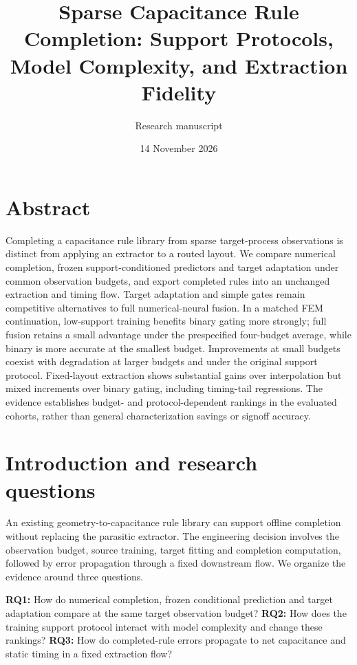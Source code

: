 \documentclass[10pt,twocolumn]{article}
\title{Sparse Capacitance Rule Completion: Support Protocols, Model Complexity, and Extraction Fidelity}
\author{Research manuscript}
\date{14 November 2026}
\begin{document}
\maketitle

\section*{Abstract}

Completing a capacitance rule library from sparse target-process observations is distinct from applying an extractor to a routed layout. We compare numerical completion, frozen support-conditioned predictors and target adaptation under common observation budgets, and export completed rules into an unchanged extraction and timing flow. Target adaptation and simple gates remain competitive alternatives to full numerical-neural fusion. In a matched FEM continuation, low-support training benefits binary gating more strongly; full fusion retains a small advantage under the prespecified four-budget average, while binary is more accurate at the smallest budget. Improvements at small budgets coexist with degradation at larger budgets and under the original support protocol. Fixed-layout extraction shows substantial gains over interpolation but mixed increments over binary gating, including timing-tail regressions. The evidence establishes budget- and protocol-dependent rankings in the evaluated cohorts, rather than general characterization savings or signoff accuracy.

\section*{Introduction and research questions}

An existing geometry-to-capacitance rule library can support offline completion without replacing the parasitic extractor. The engineering decision involves the observation budget, source training, target fitting and completion computation, followed by error propagation through a fixed downstream flow. We organize the evidence around three questions.

\textbf{RQ1:} How do numerical completion, frozen conditional prediction and target adaptation compare at the same target observation budget? \textbf{RQ2:} How does the training support protocol interact with model complexity and change these rankings? \textbf{RQ3:} How do completed-rule errors propagate to net capacitance and static timing in a fixed extraction flow?
\end{document}
